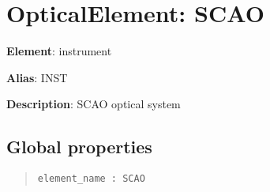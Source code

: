 

\section{OpticalElement: \textquotedbl{}SCAO\textquotedbl{}%
  \label{opticalelement-scao}%
}

\textbf{Element}: instrument

\textbf{Alias}: INST

\textbf{Description}: SCAO optical system


\subsection{Global properties%
  \label{global-properties}%
}

\begin{quote}
\begin{alltt}
\begin{lstlisting}[frame=single]
element_name : SCAO
\end{lstlisting}
\end{alltt}
\end{quote}
